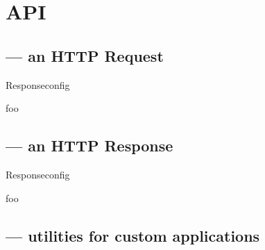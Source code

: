 \chapter{API}

\section{ --- an HTTP Request}

\begin{classdesc}{Response}{config}

foo
\end{classdesc}



\section{ --- an HTTP Response}

\begin{classdesc}{Response}{config}

foo
\end{classdesc}


\section{ --- utilities for custom applications}

